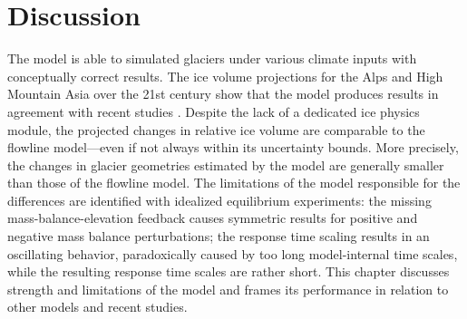 \chapter{Discussion}\label{chap:discussion}
\thispagestyle{plain}





    The \vas{} model is able to simulated glaciers under various climate inputs with conceptually correct results.
    The ice volume projections for the Alps and High Mountain Asia over the 21st century show that the \vas{} model produces results in agreement with recent studies \citep[e.g.,][]{Marzeion2020}. Despite the lack of a dedicated ice physics module, the projected changes in relative ice volume are comparable to the flowline model---even if not always within its uncertainty bounds. More precisely, the changes in glacier geometries estimated by the \vas{} model are generally smaller than those of the flowline model. The limitations of the \vas{} model responsible for the differences are identified with idealized equilibrium experiments: the missing mass-balance-elevation feedback causes symmetric results for positive and negative mass balance perturbations; the response time scaling results in an oscillating behavior, paradoxically caused by too long model-internal time scales, while the resulting response time scales are rather short. This chapter discusses strength and limitations of the \vas{} model and frames its performance in relation to other models and recent studies.
    
